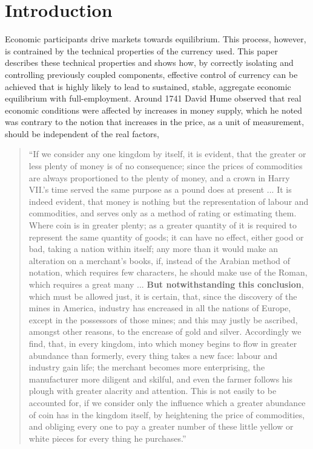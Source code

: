 \section{Introduction}

Economic participants drive markets towards equilibrium. This process, however, is contrained by the
technical properties of the currency used. This paper describes these technical properties and shows
how, by correctly isolating and controlling previously coupled components, effective control of
currency can be achieved that is highly likely to lead to sustained, stable, aggregate economic
equilibrium with full-employment. Around 1741 David Hume \cite{hume1741} observed that real economic
conditions were affected by increases in money supply, which he noted was contrary to the notion
that increases in the price, as a unit of measurement, should be independent of the real factors,

\begin{quotation}
\fontsize{8pt}{8pt}

``If we consider any one kingdom by itself, it is evident, that the greater or less plenty of money is
    of no consequence; since the prices of commodities are always proportioned to the plenty of
    money, and a crown in Harry VII.’s time served the same purpose as a pound does at present ...
    It is indeed evident, that money is nothing but the representation of labour and commodities,
    and serves only as a method of rating or estimating them. Where coin is in greater plenty; as a
    greater quantity of it is required to represent the same quantity of goods; it can have no
    effect, either good or bad, taking a nation within itself; any more than it would make an
    alteration on a merchant’s books, if, instead of the Arabian method of notation, which requires
    few characters, he should make use of the Roman, which requires a great many ... \textbf{But
    notwithstanding this conclusion}, which must be allowed just, it is certain, that, since the
    discovery of the mines in America, industry has encreased in all the nations of Europe, except
    in the possessors of those mines; and this may justly be ascribed, amongst other reasons, to the
    encrease of gold and silver.  Accordingly we find, that, in every kingdom, into which money
    begins to flow in greater abundance than formerly, every thing takes a new face: labour and
    industry gain life; the merchant becomes more enterprising, the manufacturer more diligent and
    skilful, and even the farmer follows his plough with greater alacrity and attention. This is not
    easily to be accounted for, if we consider only the influence which a greater abundance of coin
    has in the kingdom itself, by heightening the price of commodities, and obliging every one to
    pay a greater number of these little yellow or white pieces for every thing he purchases.''

\end{quotation}

